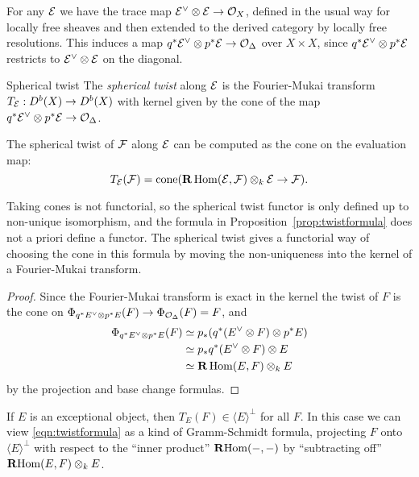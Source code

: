 For any $\mathcal{E}$ we have the trace map $\mathcal{E}^\vee\otimes\mathcal{E}\to\mathcal{O}_X$, defined
in the usual way for locally free sheaves and then extended to the derived
category by locally free resolutions. This induces a map
$q^*\mathcal{E}^\vee\otimes p^*\mathcal{E}\to\mathcal{O}_\Delta$ over $X\times X$, since
$q^*\mathcal{E}^\vee\otimes p^*\mathcal{E}$ restricts to $\mathcal{E}^\vee\otimes\mathcal{E}$ on the
diagonal.

\begin{definition}{Spherical twist}{}
    The \emph{spherical twist} along $\mathcal{E}$ is the Fourier-Mukai transform
    $T_{\mathcal{E}}:D^b(X)\to D^b(X)$ with kernel given by the cone of the map
    $q^*\mathcal{E}^\vee\otimes p^*\mathcal{E}\to\mathcal{O}_\Delta$.
\end{definition}

\begin{proposition}[label=prop:twistformula]{}{}
    The spherical twist of $\mathcal{F}$ along $\mathcal{E}$ can be computed as the cone on
    the evaluation map:
    \begin{equation}\label{eqn:twistformula}
        T_{\mathcal{E}}(\mathcal{F})=\operatorname{cone}(\operatorname{\mathbf{R}}\operatorname{Hom}(\mathcal{E},\mathcal{F})\otimes_k\mathcal{E}\to\mathcal{F}).
    \end{equation}
\end{proposition}

\begin{remark}{}{}
    Taking cones is not functorial, so the spherical twist functor is only
    defined up to non-unique isomorphism, and the formula in
    Proposition~\ref{prop:twistformula} does not a priori define a functor. The
    spherical twist gives a functorial way of choosing the cone in this formula
    by moving the non-uniqueness into the kernel of a Fourier-Mukai transform.
\end{remark}

\begin{proof}
    Since the Fourier-Mukai transform is exact in the kernel the twist of $F$
    is the cone on $\Phi_{q^*E^\vee\otimes p^*E}(F)\to\Phi_{\mathcal{O}_\Delta}(F)=F$,
    and
    \begin{align*}
        \Phi_{q^*E^\vee\otimes p^*E}(F)
            &\simeq p_*(q^*(E^\vee\otimes F)\otimes p^*E) \\
            &\simeq p_*q^*(E^\vee\otimes F)\otimes E \\
            &\simeq \operatorname{\mathbf{R}}\operatorname{Hom}(E,F)\otimes_kE
    \end{align*}
    by the projection and base change formulas.
\end{proof}

\begin{remark}{}{}
    If $E$ is an exceptional object, then $T_E(F)\in\langle E\rangle^\perp$ for
    all $F$. In this case we can view \eqref{eqn:twistformula} as a kind of
    Gramm-Schmidt formula, projecting $F$ onto $\langle E\rangle^\perp$ with
    respect to the ``inner product'' $\operatorname{\mathbf{R}Hom}(-,-)$ by ``subtracting off''
    $\operatorname{\mathbf{R}Hom}(E,F)\otimes_kE$. %
\end{remark}

